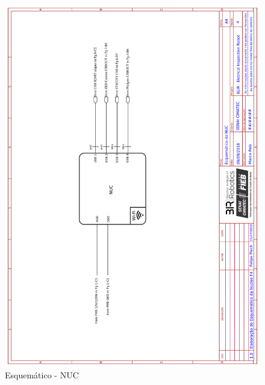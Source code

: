     \begin{figure}[H]
	\centering
	\includegraphics[width=14cm]{Figures/EsquematicoNUC.png}
	\caption{Esquemático - NUC} \label{NUC}
	\end{figure}
	
    \pagebreak
    
